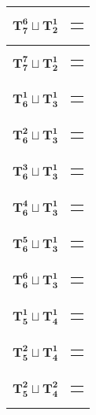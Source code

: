 \documentclass{article}
\begin{document}
\begin{longtable}{|c|c|}
    $\mathbf{T_{7}^{6}} \sqcup \mathbf{T_{2}^{1}}$ & \begin{tabular}{@{}l@{}} $(5,11,9,10,6,12,7)\sqcup(8,1)$ \end{tabular} \\ \hline
    $\mathbf{T_{7}^{7}} \sqcup \mathbf{T_{2}^{1}}$ & \begin{tabular}{@{}l@{}} $(4,8,1,6,0,5,3)\sqcup(9,10)$ \end{tabular} \\ \hline
    $\mathbf{T_{6}^{1}} \sqcup \mathbf{T_{3}^{1}}$ & \begin{tabular}{@{}l@{}} $(0,6,1,5,2,9)\sqcup(11,10,12)$ \end{tabular} \\ \hline
    $\mathbf{T_{6}^{2}} \sqcup \mathbf{T_{3}^{1}}$ & \begin{tabular}{@{}l@{}} $(3,6,1,8,4,0)\sqcup(10,9,11)$ \end{tabular} \\ \hline
    $\mathbf{T_{6}^{3}} \sqcup \mathbf{T_{3}^{1}}$ & \begin{tabular}{@{}l@{}} $(5,11,9,12,7,10)\sqcup(1,8,4)$ \end{tabular} \\ \hline
    $\mathbf{T_{6}^{4}} \sqcup \mathbf{T_{3}^{1}}$ & \begin{tabular}{@{}l@{}} $(3,8,4,1,6,7)\sqcup(10,9,11)$ \end{tabular} \\ \hline
    $\mathbf{T_{6}^{5}} \sqcup \mathbf{T_{3}^{1}}$ & \begin{tabular}{@{}l@{}} $(5,1,8,3,4,7)\sqcup(10,9,11)$ \end{tabular} \\ \hline
    $\mathbf{T_{6}^{6}} \sqcup \mathbf{T_{3}^{1}}$ & \begin{tabular}{@{}l@{}} $(4,1,8,5,6,7)\sqcup(10,9,11)$ \end{tabular} \\ \hline
    $\mathbf{T_{5}^{1}} \sqcup \mathbf{T_{4}^{1}}$ & \begin{tabular}{@{}l@{}} $(0,6,1,5,2)\sqcup(9,8,10,3)$ \end{tabular} \\ \hline
    $\mathbf{T_{5}^{2}} \sqcup \mathbf{T_{4}^{1}}$ & \begin{tabular}{@{}l@{}} $(7,1,8,5,6)\sqcup(0,4,2,3)$ \end{tabular} \\ \hline
    $\mathbf{T_{5}^{2}} \sqcup \mathbf{T_{4}^{2}}$ & \begin{tabular}{@{}l@{}} $(7,1,8,4,6)\sqcup(10,9,11,12)$ \end{tabular} \\ \hline

\end{longtable}
\end{document}
